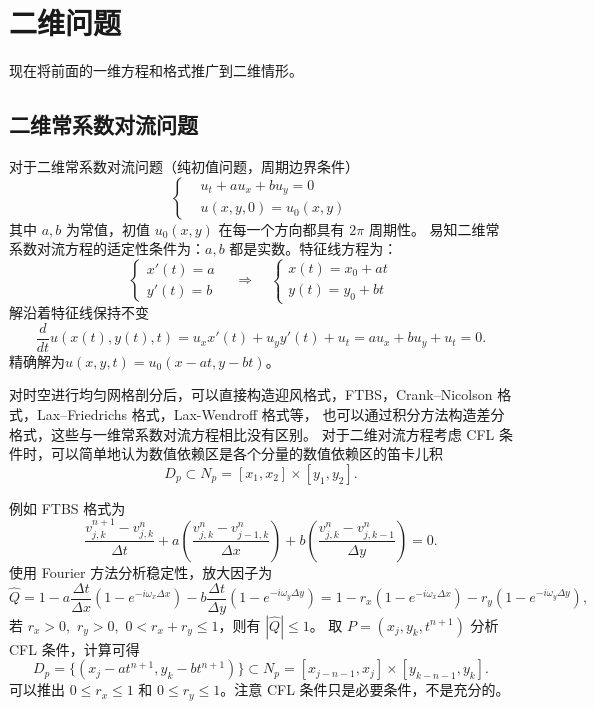 \chapter{二维问题}

现在将前面的一维方程和格式推广到二维情形。


\section{二维常系数对流问题}

对于二维常系数对流问题（纯初值问题，周期边界条件）
\[
    \left\{
    \begin{aligned}
         & u_t + a u_x + b u_y = 0 \\
         & u(x,y,0) = u_0(x,y)
    \end{aligned}
    \right.
\]
其中 $a,b$ 为常值，初值 $u_0(x,y)$ 在每一个方向都具有 $2\pi$ 周期性。
易知二维常系数对流方程的适定性条件为：$a,b$ 都是实数。特征线方程为：
\[
    \left\{
    \begin{aligned}
        x'(t) = a \\
        y'(t) = b
    \end{aligned}
    \right.
    \quad \Rightarrow \quad
    \left\{
    \begin{aligned}
        x(t) = x_0 + a t \\
        y(t) = y_0 + b t
    \end{aligned}
    \right.
\]
解沿着特征线保持不变
\[
    \frac{d}{dt}u(x(t),y(t),t) = u_x x'(t) + u_y y'(t) + u_t = a u_x + b u_y + u_t = 0.
\]
精确解为$u(x,y,t) = u_0(x - a t, y - b t)$。

对时空进行均匀网格剖分后，可以直接构造迎风格式，FTBS，Crank–Nicolson 格式，Lax–Friedrichs 格式，Lax-Wendroff 格式等，
也可以通过积分方法构造差分格式，这些与一维常系数对流方程相比没有区别。
对于二维对流方程考虑 CFL 条件时，可以简单地认为数值依赖区是各个分量的数值依赖区的笛卡儿积
\[
    D_p \subset  N_p = [x_1,x_2] \times [y_1,y_2].
\]

例如 FTBS 格式为
\[
    \frac{v_{j,k}^{n+1} - v_{j,k}^n}{\Delta t}
    + a \left(\frac{v_{j,k}^n - v_{j-1,k}^n}{\Delta x}\right)
    + b \left(\frac{v_{j,k}^n - v_{j,k-1}^n}{\Delta y}\right) = 0.
\]
使用 Fourier 方法分析稳定性，放大因子为
\[
    \widehat{Q} = 1
    - a \frac{\Delta t}{\Delta x}(1 - e^{- i \omega_x \Delta x})
    - b \frac{\Delta t}{\Delta y}(1 - e^{- i \omega_y \Delta y})
    = 1
    - r_x(1 - e^{- i \omega_x \Delta x})
    - r_y(1 - e^{- i \omega_y \Delta y}),
\]
若 $r_x > 0,\,\, r_y > 0,\,\, 0 < r_x + r_y \le 1$，则有 $|\widehat{Q}| \le 1$。
取 $P = (x_j,y_k,t^{n+1})$ 分析 CFL 条件，计算可得
\[
    D_p = \{(x_j - a t^{n+1},y_k - b t^{n+1})\} \subset N_p
    = [x_{j-n-1},x_j] \times [y_{k-n-1},y_k].
\]
可以推出 $0 \le r_x \le 1$ 和 $0 \le r_y \le 1$。注意 CFL 条件只是必要条件，不是充分的。

